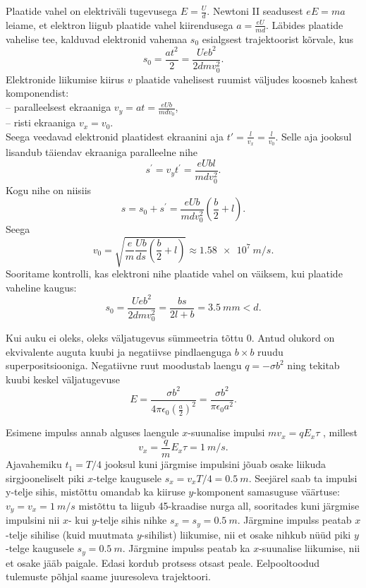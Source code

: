 \documentclass[10pt]{article}
\begin{document}
{Plaatide vahel on elektriväli tugevusega $E = \frac{U}{d}$. Newtoni II seadusest $eE = ma$ leiame, et elektron liigub plaatide vahel kiirendusega $a = \frac{eU}{md}$. Läbides plaatide vahelise tee, kalduvad elektronid vahemaa $s_0$ esialgsest trajektoorist kõrvale, kus
\[
s_{0}=\frac{a t^{2}}{2}=\frac{U e b^{2}}{2 d m v_{0}^{2}}.
\]
Elektronide liikumise kiirus $v$ plaatide vahelisest ruumist väljudes koosneb kahest komponendist:\\
-- paralleelsest ekraaniga $v_{y}=a t=\frac{e U b}{m d v_{0}}$,\\
-- risti ekraaniga $v_x = v_0$.\\
Seega veedavad elektronid plaatidest ekraanini aja $t' = \frac{l}{v_x} = \frac{l}{v_0}$. Selle aja jooksul lisandub täiendav ekraaniga paralleelne nihe
\[
s^{\prime}=v_{y} t^{\prime}=\frac{e U b l}{m d v_{0}^{2}}.
\]
Kogu nihe on niisiis
\[
s=s_{0}+s^{\prime}=\frac{e U b}{m d v_{0}^{2}}\left(\frac{b}{2}+l\right).
\]
Seega
\[
v_{0}=\sqrt{\frac{e}{m} \frac{U b}{d s}\left(\frac{b}{2}+l\right)} \approx \SI{1,58e7}{m/s}.
\]
Sooritame kontrolli, kas elektroni nihe plaatide vahel on väiksem, kui plaatide vaheline kaugus:
\[
s_{0}=\frac{U e b^{2}}{2 d m v_{0}^{2}}=\frac{bs}{2l + b} = \SI{3.5}{mm} < d.
\]
\probend
\bigskip


\solu
Kui auku ei oleks, oleks väljatugevus sümmeetria tõttu 0. Antud olukord on ekvivalente auguta kuubi ja negatiivse pindlaenguga $b\times b$ ruudu superpositsiooniga. Negatiivne ruut moodustab laengu $q = -\sigma b^2$ ning tekitab kuubi keskel väljatugevuse
\[
E=\frac{\sigma b^{2}}{4\pi \epsilon_{0} \left(\frac{a}{2}\right)^{2}} = \frac{\sigma b^{2}}{\pi \epsilon_{0} a^{2}}.
\]
\probend
\bigskip


\solu
Esimene impulss annab alguses laengule $x$-suunalise impulsi $mv_x = qE_x\tau$ , millest
\[
v_{x}=\frac{q}{m} E_{x} \tau= \SI{1}{m/s}.
\]
Ajavahemiku $t_1 = T /4$ jooksul kuni järgmise impulsini jõuab osake liikuda sirgjooneliselt piki $x$-telge kaugusele
$s_x = v_xT /4 = \SI{0,5}{m}$. Seejärel saab ta impulsi y-telje sihis, mistõttu omandab ka kiiruse $y$-komponent
samasuguse väärtuse: $v_y = v_x = \SI{1}{m/s}$ mistõttu ta liigub \num{45}-kraadise nurga all,
sooritades kuni järgmise impulsini nii $x$- kui $y$-telje sihis nihke $s_x = s_y = \SI{0,5}{m}$. Järgmine impulss peatab $x$-telje sihilise (kuid muutmata $y$-sihilist) liikumise, nii et
osake nihkub nüüd piki $y$-telge kaugusele $s_y = \SI{0,5}{m}$. Järgmine impulss peatab ka $x$-suunalise liikumise, nii et osake jääb paigale. Edasi kordub protsess otsast
peale. Eelpooltoodud tulemuste põhjal saame juuresoleva trajektoori.

}
\end{document}
